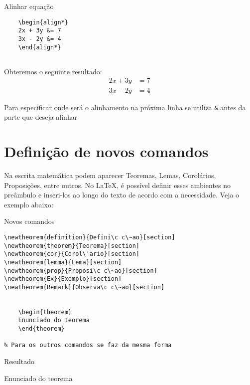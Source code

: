 \begin{trailer}{Alinhar equação}
\begin{verbatim}
    \begin{align*} 
    2x + 3y &= 7 
    3x - 2y &= 4
    \end{align*}


\end{verbatim}
\end{trailer}

\noindent Obteremos o seguinte resultado: 
\begin{align*}
    2x + 3y &= 7 \\
    3x - 2y &= 4
\end{align*}
 

\noindent Para especificar onde será o alinhamento na próxima linha se utiliza \verb|&| antes da parte que deseja alinhar

\section{Defini\c c\~ao de novos comandos}
Na escrita matemática podem aparecer Teoremas, Lemas, Corolários, Proposições, entre outros. No \LaTeX{}, é possível definir esses ambientes no preâmbulo e inseri-los ao longo do texto de acordo com a necessidade. Veja o exemplo abaixo:

\begin{trailer}{Novos comandos}

\begin{verbatim}
\newtheorem{definition}{Defini\c c\~ao}[section]
\newtheorem{theorem}{Teorema}[section]
\newtheorem{cor}{Corol\'ario}[section]
\newtheorem{lemma}{Lema}[section]
\newtheorem{prop}{Proposi\c c\~ao}[section]
\newtheorem{Ex}{Exemplo}[section]
\newtheorem{Remark}{Observa\c c\~ao}[section]


    \begin{theorem}
    Enunciado do teorema 
    \end{theorem}
    
% Para os outros comandos se faz da mesma forma

\end{verbatim}
\end{trailer}

\begin{trailer}{Resultado}
   \begin{teorema}
  Enunciado do teorema
   \end{teorema}
\end{trailer}

\eject
\enlargethispage{24pt}



